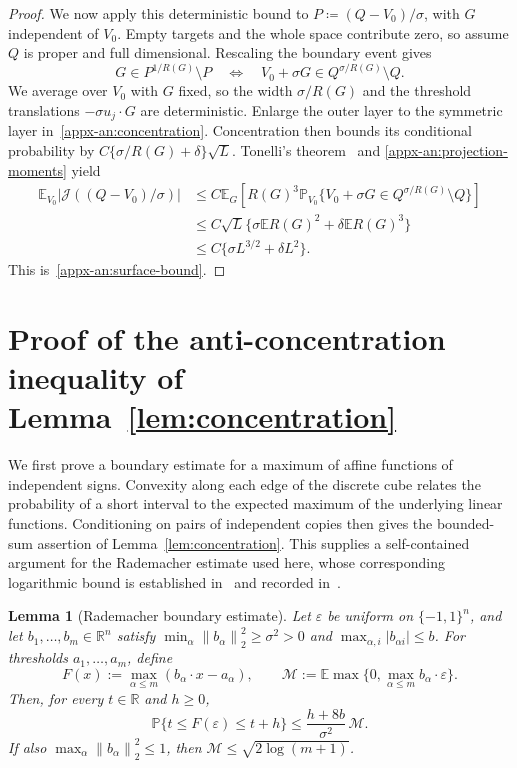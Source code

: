 \documentclass[11pt,letterpaper]{article}
\newtheorem{lemma}{Lemma}
\theoremstyle{remark}
\newcommand{\E}{\mathbb E}
\newcommand{\Pp}{\mathbb P}
\newcommand{\R}{\mathbb R}
\newcommand{\norm}[1]{\left\lVert#1\right\rVert}
\newcommand{\surf}{\mathcal J}
\begin{document}
\begin{proof}
We now apply this deterministic bound to \(P\coloneqq (Q-V_0)/\sigma\),
with \(G\) independent of \(V_0\). Empty targets and the whole space
contribute zero, so assume \(Q\) is proper and full dimensional.
Rescaling the boundary event gives
\[
 G\in P^{1/R(G)}\setminus P
 \quad\Longleftrightarrow\quad
 V_0+\sigma G\in Q^{\sigma/R(G)}\setminus Q.
\]
We average over \(V_0\) with \(G\) fixed, so the width
\(\sigma/R(G)\) and the threshold translations
\(-\sigma u_j\cdot G\) are deterministic. Enlarge the outer layer
to the symmetric layer in~\eqref{appx-an:concentration}. Concentration then
bounds its conditional probability by
\(C\{\sigma/R(G)+\delta\}\sqrt L\). Tonelli's
theorem~\cite[Section~2.5]{Folland1999} and
\eqref{appx-an:projection-moments} yield
\begin{align*}
 \E_{V_0}|\surf((Q-V_0)/\sigma)|
 &\le C\E_G\left[R(G)^3
       \Pp_{V_0}\{V_0+\sigma G\in Q^{\sigma/R(G)}\setminus Q\}\right]\\
 &\le C\sqrt L\{\sigma\E R(G)^2+\delta\E R(G)^3\}\\
 &\le C\{\sigma L^{3/2}+\delta L^2\}.
\end{align*}
This is~\eqref{appx-an:surface-bound}.
\end{proof}

\section{\texorpdfstring{Proof of the anti-concentration inequality of Lemma~\ref{lem:concentration}}{Proof of the rectangle anti-concentration inequality}}\label{appx-app:concentration}
\label{appx-conc:conditioning}

We first prove a boundary estimate for a maximum of affine functions
of independent signs. Convexity along each edge of the discrete cube
relates the probability of a short interval to the expected maximum
of the underlying linear functions. Conditioning on pairs of independent
copies then gives the bounded-sum assertion of Lemma~\ref{lem:concentration}.
This supplies a self-contained argument for the Rademacher estimate
used here, whose corresponding logarithmic bound is established
in~\cite{OST} and recorded in~\cite[Lemma~J.4]{CCKK2022}.

\begin{lemma}[Rademacher boundary estimate]\label{appx-lem:cube-boundary}
Let \(\varepsilon\) be uniform on \(\{-1,1\}^n\), and let
\(b_1,\ldots,b_m\in\R^n\) satisfy
\(\min_\alpha\norm{b_\alpha}_2^2\ge\sigma^2>0\) and
\(\max_{\alpha,i}|b_{\alpha i}|\le b\).
For thresholds \(a_1,\ldots,a_m\), define
\[
 F(x):=\max_{\alpha\le m}(b_\alpha\cdot x-a_\alpha),
 \qquad
 \mathcal M:=\E\max\{0,\max_{\alpha\le m}b_\alpha\cdot\varepsilon\}.
\]
Then, for every \(t\in\R\) and \(h\ge0\),
\begin{equation}
 \Pp\{t\le F(\varepsilon)\le t+h\}
 \le\frac{h+8b}{\sigma^2}\,\mathcal M.
 \label{appx-eq:cube-boundary}
\end{equation}
If also \(\max_\alpha\norm{b_\alpha}_2^2\le1\), then
\(\mathcal M\le\sqrt{2\log(m+1)}\).
\end{lemma}
\end{document}
